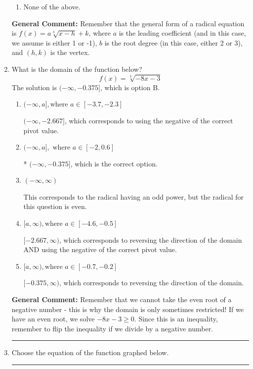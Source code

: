 \documentclass{extbook}[14pt]
\newcommand{\litem}[1]{\item #1

\rule{\textwidth}{0.4pt}}
\begin{document}
\begin{enumerate}
{\begin{enumerate}[label=\Alph*.]
\item None of the above.\end{enumerate}
\textbf{General Comment:} Remember that the general form of a radical equation is $ f(x) = a \sqrt[b]{x - h} + k $, where $a$ is the leading coefficient (and in this case, we assume is either 1 or -1), $b$ is the root degree (in this case, either 2 or 3), and $(h, k)$ is the vertex.
}
\litem{
What is the domain of the function below?
\[ f(x) = \sqrt[4]{-8 x - 3} \]The solution is \( (-\infty, -0.375] \), which is option B.\begin{enumerate}[label=\Alph*.]
\item \( (-\infty, a], \text{where } a \in [-3.7, -2.3] \)

$(-\infty, -2.667]$, which corresponds to using the negative of the correct pivot value.
\item \( (-\infty, a], \text{ where } a \in [-2, 0.6] \)

* $(-\infty, -0.375]$, which is the correct option.
\item \( (-\infty, \infty) \)

This corresponds to the radical having an odd power, but the radical for this question is even.
\item \( [a, \infty), \text{where } a \in [-4.6, -0.5] \)

$[-2.667, \infty)$, which corresponds to reversing the direction of the domain AND using the negative of the correct pivot value.
\item \( [a, \infty), \text{where } a \in [-0.7, -0.2] \)

 $[-0.375, \infty)$, which corresponds to reversing the direction of the domain.
\end{enumerate}

\textbf{General Comment:} Remember that we cannot take the even root of a negative number - this is why the domain is only sometimes restricted! If we have an even root, we solve $-8 x - 3 \geq 0$. Since this is an inequality, remember to flip the inequality if we divide by a negative number.
}
\litem{
Choose the equation of the function graphed below.

}
\end{enumerate}
\end{document}
